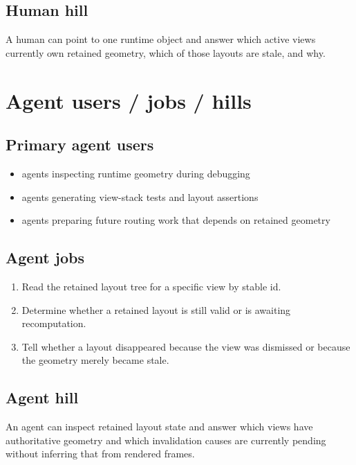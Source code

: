 \subsection{Human hill}\label{record-151-human-hill}

A human can point to one runtime object and answer which active views currently own retained geometry, which of those layouts are stale, and why.

\section{Agent users / jobs / hills}\label{record-151-agent-users-jobs-hills}

\subsection{Primary agent users}\label{record-151-primary-agent-users}

\begin{itemize}
\tightlist
\item
  agents inspecting runtime geometry during debugging
\item
  agents generating view-stack tests and layout assertions
\item
  agents preparing future routing work that depends on retained geometry
\end{itemize}

\subsection{Agent jobs}\label{record-151-agent-jobs}

\begin{enumerate}
\def\labelenumi{\arabic{enumi}.}
\tightlist
\item
  Read the retained layout tree for a specific view by stable id.
\item
  Determine whether a retained layout is still valid or is awaiting recomputation.
\item
  Tell whether a layout disappeared because the view was dismissed or because the geometry merely became stale.
\end{enumerate}

\subsection{Agent hill}\label{record-151-agent-hill}

An agent can inspect retained layout state and answer which views have authoritative geometry and which invalidation causes are currently pending without inferring that from rendered frames.

